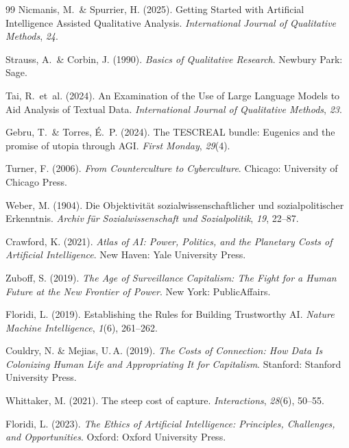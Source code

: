 \documentclass[12pt,a4paper]{article}
\begin{document}
\begin{thebibliography}{99}
  Nicmanis, M.~\& Spurrier, H. (2025).
  Getting Started with Artificial Intelligence Assisted Qualitative Analysis.
  \textit{International Journal of Qualitative Methods}, \textit{24}.

  Strauss, A.~\& Corbin, J. (1990).
  \textit{Basics of Qualitative Research}.
  Newbury Park: Sage.

  Tai, R.~et~al. (2024).
  An Examination of the Use of Large Language Models to Aid Analysis of Textual Data.
  \textit{International Journal of Qualitative Methods}, \textit{23}.

  Gebru, T.~\& Torres, \'E.~P. (2024).
  The TESCREAL bundle: Eugenics and the promise of utopia through AGI.
  \textit{First Monday}, \textit{29}(4).

  Turner, F. (2006).
  \textit{From Counterculture to Cyberculture}.
  Chicago: University of Chicago Press.

  Weber, M. (1904).
  Die \glqq Objektivit\"at\grqq{} sozialwissenschaftlicher und sozialpolitischer Erkenntnis.
  \textit{Archiv f\"ur Sozialwissenschaft und Sozialpolitik}, \textit{19}, 22--87.

  Crawford, K. (2021).
  \textit{Atlas of AI: Power, Politics, and the Planetary Costs of Artificial Intelligence}.
  New Haven: Yale University Press.

  Zuboff, S. (2019).
  \textit{The Age of Surveillance Capitalism: The Fight for a Human Future at the New Frontier of Power}.
  New York: PublicAffairs.

  Floridi, L. (2019).
  Establishing the Rules for Building Trustworthy AI.
  \textit{Nature Machine Intelligence}, \textit{1}(6), 261--262.

  Couldry, N. \& Mejias, U.\,A. (2019).
  \textit{The Costs of Connection: How Data Is Colonizing Human Life and Appropriating It for Capitalism}.
  Stanford: Stanford University Press.

  Whittaker, M. (2021).
  The steep cost of capture.
  \textit{Interactions}, \textit{28}(6), 50--55.

  Floridi, L. (2023).
  \textit{The Ethics of Artificial Intelligence: Principles, Challenges, and Opportunities}.
  Oxford: Oxford University Press.


\end{thebibliography}
\end{document}
